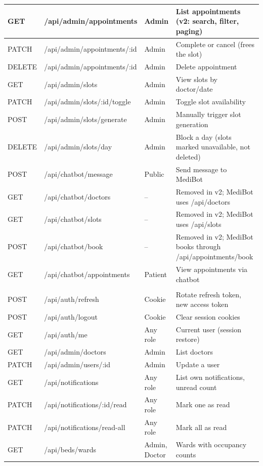 \begin{longtable}{|L{1.9cm}|L{5.4cm}|L{2.1cm}|L{3.8cm}|}
\hline
GET & /api/admin/appointments & Admin & List appointments (v2: search, filter, paging) \\
\hline
PATCH & /api/admin/appointments/:id & Admin & Complete or cancel (frees the slot) \\
\hline
DELETE & /api/admin/appointments/:id & Admin & Delete appointment \\
\hline
GET & /api/admin/slots & Admin & View slots by doctor/date \\
\hline
PATCH & /api/admin/slots/:id/toggle & Admin & Toggle slot availability \\
\hline
POST & /api/admin/slots/generate & Admin & Manually trigger slot generation \\
\hline
DELETE & /api/admin/slots/day & Admin & Block a day (slots marked unavailable, not deleted) \\
\hline
POST & /api/chatbot/message & Public & Send message to MediBot \\
\hline
GET & /api/chatbot/doctors & -- & Removed in v2; MediBot uses /api/doctors \\
\hline
GET & /api/chatbot/slots & -- & Removed in v2; MediBot uses /api/slots \\
\hline
POST & /api/chatbot/book & -- & Removed in v2; MediBot books through /api/appointments/book \\
\hline
GET & /api/chatbot/appointments & Patient & View appointments via chatbot \\
\hline
{}  \\
\hline
POST & /api/auth/refresh & Cookie & Rotate refresh token, new access token \\
\hline
POST & /api/auth/logout & Cookie & Clear session cookies \\
\hline
GET & /api/auth/me & Any role & Current user (session restore) \\
\hline
GET & /api/admin/doctors & Admin & List doctors \\
\hline
PATCH & /api/admin/users/:id & Admin & Update a user \\
\hline
GET & /api/notifications & Any role & List own notifications, unread count \\
\hline
PATCH & /api/notifications/:id/read & Any role & Mark one as read \\
\hline
PATCH & /api/notifications/read-all & Any role & Mark all as read \\
\hline
GET & /api/beds/wards & Admin, Doctor & Wards with occupancy counts \\

\end{longtable}
